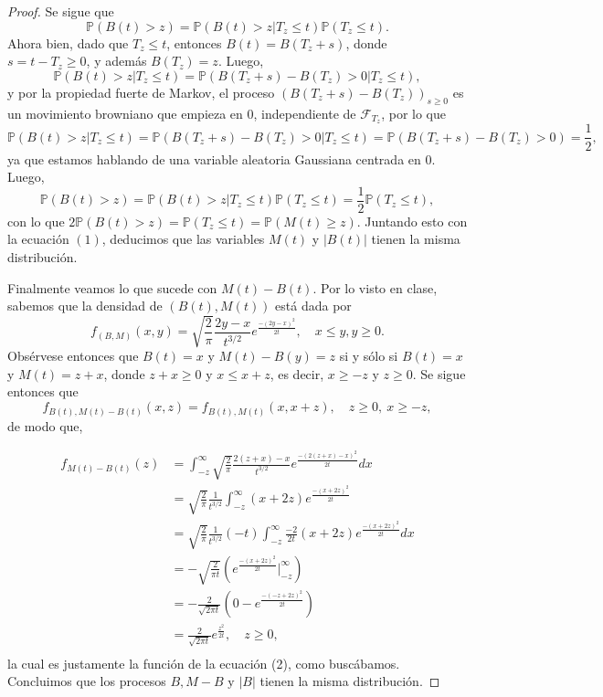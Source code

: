 \documentclass[letterpaper]{article}
\newcommand{\F}{\mathcal{F}}
\renewcommand{\P}{\mathbb{P}}
\newcommand{\1}{\mathds{1}}
\theoremstyle{definition}
\theoremstyle{definition}
\theoremstyle{definition}
\theoremstyle{definition}
\theoremstyle{definition}
\begin{document}
\begin{enumerate}
\begin{proof}
      Se sigue que 
      \[
        \P\left(B(t)>z\right)=\P\left(B(t)>z|T_z\leq t\right)\P\left(T_z\leq t\right).
      \]
      Ahora bien, dado que $T_z\leq t$, entonces $B(t)=B(T_z+s)$, donde $s=t-T_z\geq0$, y además $B(T_z)=z$. Luego, 
      \[
        \P\left(B(t)>z|T_z\leq t\right)=\P\left(B(T_z+s)-B(T_z)>0|T_z\leq t\right),
      \]
      y por la propiedad fuerte de Markov, el proceso $(B(T_z+s)-B(T_z))_{s\geq0}$ es un movimiento browniano que empieza en 0,
      independiente de $\F_{T_z}$, por lo que
      \[
        \P\left(B(t)>z|T_z\leq t\right)=\P\left(B(T_z+s)-B(T_z)>0|T_z\leq t\right)=\P(B(T_z+s)-B(T_z)>0)=\frac{1}{2},
      \]
      ya que estamos hablando de una variable aleatoria Gaussiana centrada en 0. Luego,
      \[
        \P\left(B(t)>z\right)=\P\left(B(t)>z|T_z\leq t\right)\P\left(T_z\leq t\right)=\frac{1}{2}\P\left(T_z\leq t\right),
      \]
      con lo que $2\P\left(B(t)>z\right)=\P\left(T_z\leq t\right)=\P(M(t)\geq z)$. Juntando esto con la ecuación $(1)$, deducimos
      que las variables $M(t)$ y $|B(t)|$ tienen la misma distribución.
      \newline

      Finalmente veamos lo que sucede con $M(t)-B(t)$. Por lo visto en clase, sabemos que la densidad de $(B(t),M(t))$ está
      dada por 
      \[
        f_{(B,M)}(x,y)=\sqrt{\frac{2}{\pi}}\frac{2y-x}{t^{3/2}}e^{\frac{-(2y-x)^2}{2t}}, \quad x\leq y, y\geq0.
      \]
      Obsérvese entonces que $B(t)=x$ y $M(t)-B(y)=z$ si y sólo si $B(t)=x$ y $M(t)=z+x$, donde $z+x\geq0$ y $x\leq x+z$, es decir,
      $x\geq -z$ y $z\geq0$. Se sigue entonces que
      \[
      f_{B(t),M(t)-B(t)}(x,z)=f_{B(t),M(t)}(x,x+z), \quad z\geq0, \  x\geq -z,  
      \]
      de modo que, 
      
      \begin{align*}
        f_{M(t)-B(t)}(z)&=\int_{-z}^{\infty} \sqrt{\frac{2}{\pi}}\frac{2(z+x)-x}{t^{3/2}}e^{\frac{-(2(z+x)-x)^2}{2t}}dx\\
        &=\sqrt{\frac{2}{\pi}}\frac{1}{t^{3/2}}\int_{-z}^{\infty}(x+2z)e^{\frac{-(x+2z)^2}{2t}}\\
        &=\sqrt{\frac{2}{\pi}}\frac{1}{t^{3/2}}\left(-t\right)\int_{-z}^{\infty}\frac{-2}{2t}(x+2z)e^{\frac{-(x+2z)^2}{2t}}dx\\
        &=-\sqrt{\frac{2}{\pi t}}\left(e^{\frac{-(x+2z)^2}{2t}}\Big|_{-z}^{\infty}\right)\\
        &=-\frac{2}{\sqrt{2\pi t}}\left(0-e^{\frac{-(-z+2z)^2}{2t}}\right)\\
        &=\frac{2}{\sqrt{2\pi t}}e^{\frac{z^2}{2t}}, \quad z\geq0,\\
      \end{align*}
      la cual es justamente la función de la ecuación (2), como buscábamos. Concluimos que los procesos $B, M-B \text{ y } |B|$ tienen 
      la misma distribución.
      

\end{proof}
\end{enumerate}
\end{document}
